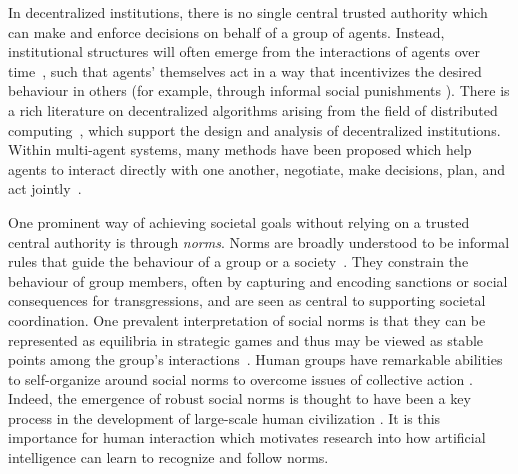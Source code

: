 \documentclass[11pt, a4paper, logo, onecolumn, nonumbering]{deepmind}
\begin{document}
In decentralized institutions, there is no single central trusted authority which can make and enforce decisions on behalf of a group of agents. Instead, institutional structures will often emerge from the interactions of agents over time~\cite{ostrom1998behavioral,shoham1997emergence}, such that agents' themselves act in a way that incentivizes the desired behaviour in others (for example, through informal social punishments \cite{wiessner2005norm}). 
There is a rich literature on decentralized algorithms arising from the field of distributed computing~\cite{tanenbaum2007distributed}, which support the design and analysis of decentralized institutions.
Within multi-agent systems, many methods have been proposed which help agents to interact directly with one another, negotiate, make decisions, plan, and act jointly~\cite{smith1980contract,horling2004survey,ferber1999multi,jennings1996coordination,o1996foundations,bond2014readings,wellman1993market,vazquez2005organizing,castelfranchi1998modelling}.



One prominent way of achieving societal goals without relying on a trusted central authority is through {\it norms}.
Norms are broadly understood to be informal rules that guide the behaviour of a group or a society~\cite{sep-social-norms}.%
They constrain the behaviour of group members, often by capturing and encoding sanctions or social consequences for transgressions, and are seen as central to supporting societal coordination. One prevalent interpretation of social norms is that they can be represented as equilibria in strategic games and thus may be viewed as stable points among the group's interactions~\cite{bicchieri2006grammar,morrow2014order}.
Human groups have remarkable abilities to self-organize around social norms to overcome issues of collective action \cite{10.2307/2646923}. Indeed, the emergence of robust social norms is thought to have been a key process in the development of large-scale human civilization \cite{APICELLA2019R447, 10.2307/j.ctvc77f0d, harari2015sapiens}. It is this importance for human interaction which motivates research into how artificial intelligence can learn to recognize and follow norms.
\end{document}
